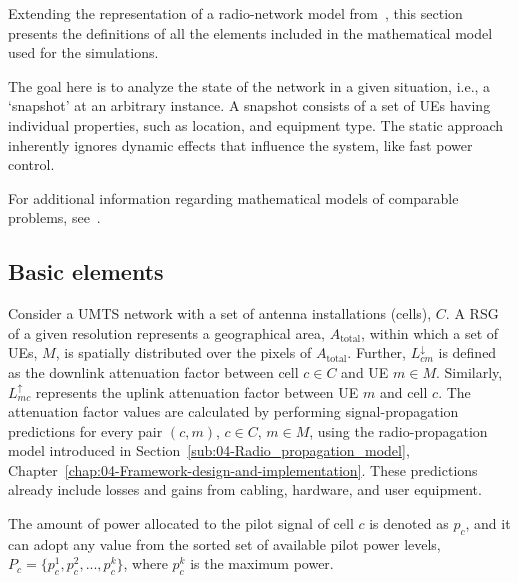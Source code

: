 Extending the representation of a radio-network model from~\cite{nawrocki2006understanding},
this section presents the definitions of all the elements included
in the mathematical model used for the simulations.

The goal here is to analyze the state of the network in a given situation,
i.e., a \textquoteleft{}snapshot\textquoteright{} at an arbitrary
instance. A snapshot consists of a set of UEs having individual properties,
such as location, and equipment type. The static approach inherently
ignores dynamic effects that influence the system, like fast power
control. 

For additional information regarding mathematical models of comparable
problems, see~\cite{Nawrocki_Understanding:2006}.


\subsection{Basic elements}

Consider a UMTS network with a set of antenna installations (cells),
$C$.
A RSG of a given resolution represents a geographical area, $A_{\mathrm{total}}$,
within which a set of UEs, $M$,
is spatially distributed over the pixels of $A_{\mathrm{total}}$.
Further, $L_{cm}^{\downarrow}$
is defined as the downlink attenuation factor between cell $c\in C$
and UE $m\in M$. Similarly, $L_{mc}^{\uparrow}$
represents the uplink attenuation factor between UE $m$ and cell
$c$. The attenuation factor values are calculated by performing signal-propagation
predictions for every pair $(c,m)$, $c\in C$, $m\in M$, using the
radio-propagation model introduced in Section~\ref{sub:04-Radio_propagation_model},
Chapter~\ref{chap:04-Framework-design-and-implementation}. These
predictions already include losses and gains from cabling, hardware,
and user equipment.

The amount of power allocated to the pilot signal of cell $c$ is
denoted as $p_{c}$,
and it can adopt any value from the sorted set of available pilot
power levels, $P_{c}=\{p_{c}^{1},p_{c}^{2},...,p_{c}^{k}\}$,
where $p_{c}^{k}$ is the maximum power.

